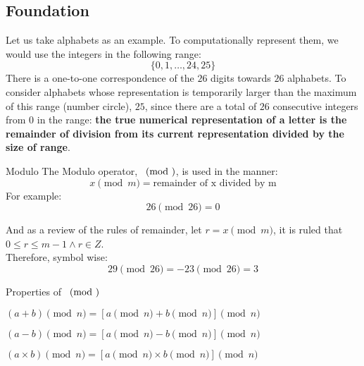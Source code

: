 \subsection{Foundation}
Let us take alphabets as an example. To computationally represent them, we would use the integers in the following range:
\[\{0, 1, \dots, 24, 25\}\]
There is a one-to-one correspondence of the $26$ digits towards $26$ alphabets. To consider alphabets whose representation is temporarily larger than the maximum of this range (number circle), $25$, since there are a total of $26$ consecutive integers from $0$ in the range: \textbf{the true numerical representation of a letter is the remainder of division from its current representation divided by the size of range}.
\begin{ln-symbol}{Modulo}{}
    The Modulo operator, $\pmod$, is used in the manner:
    \[x\pmod{m} = \text{remainder of x divided by m}\]
    For example:
    \[26\pmod{26} = 0\]
\end{ln-symbol}
And as a review of the rules of remainder, let $r = x\pmod{m}$, it is ruled that $0 \leq r \leq m - 1 \land r \in Z$. \\
Therefore, symbol wise:
\[29\pmod{26} = -23\pmod{26} = 3\]
\begin{ln-symbol}{Properties of $\pmod$}{}
    \begin{bindenum}
        \item $(a + b)\pmod{n} = [a\pmod{n} + b\pmod{n}]\pmod{n}$
        \item $(a - b)\pmod{n} = [a\pmod{n} - b\pmod{n}]\pmod{n}$
        \item $(a \times b)\pmod{n} = [a\pmod{n} \times b\pmod{n}]\pmod{n}$
    \end{bindenum}
\end{ln-symbol}

